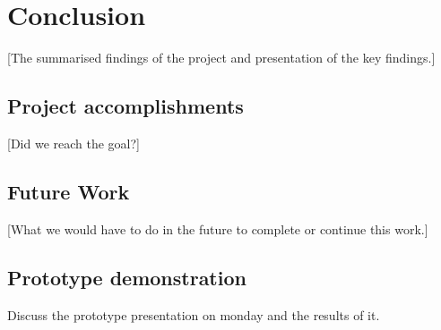 \section{Conclusion}\label{Conclusion}
[The summarised findings of the project and presentation of the key findings.]
    \subsection{Project accomplishments}\label{Project accomplishments}
    [Did we reach the goal?]
    \subsection{Future Work}\label{Future Work}
    [What we would have to do in the future to complete or continue this work.]
    
    \subsection{Prototype demonstration}\label{Prototype Demonstration}
    Discuss the prototype presentation on monday  and the results of it. 
